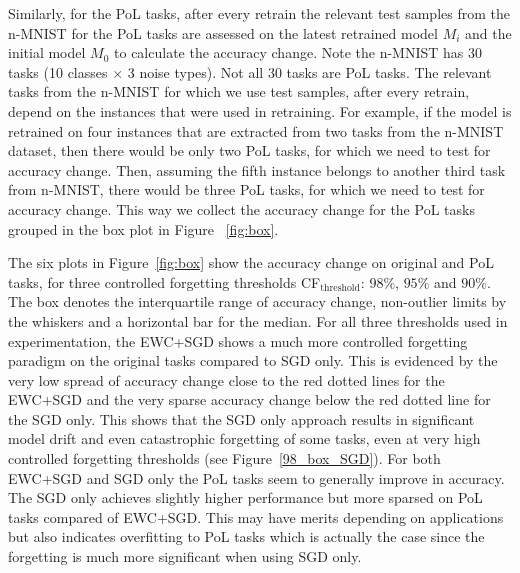 Similarly, for the PoL tasks, after every retrain the relevant test samples from the n-MNIST for the PoL tasks are assessed on the latest retrained model $M_i$ and the initial model $M_0$ to calculate the accuracy change.
%
Note the n-MNIST has 30 tasks (10 classes $\times$ 3 noise types). 
%
Not all 30 tasks are PoL tasks. 
%
The relevant tasks from the n-MNIST for which we use test samples, after every retrain, depend on the instances that were used in retraining. 
%
For example, if the model is retrained on four instances that are extracted from two tasks from the n-MNIST dataset, then there would be only two PoL tasks, for which we need to test for accuracy change. 
%
Then, assuming the fifth instance belongs to another third task from n-MNIST, there would be three PoL tasks, for which we need to test for accuracy change.  
%
This way we collect the accuracy change for the PoL tasks grouped in the box plot in Figure ~\ref{fig:box}.

The six plots in Figure~\ref{fig:box} show the accuracy change on original and PoL tasks, for three controlled forgetting thresholds CF$_{\text{threshold}}$: $98\%$,  $95\%$ and $90\%$.
%
The box denotes the interquartile range of accuracy change, non-outlier limits by the whiskers and a horizontal bar for the median. 
%
For all three thresholds used in experimentation, the EWC+SGD shows a much more controlled forgetting paradigm on the original tasks compared to SGD only. 
%
This is evidenced by the very low spread of accuracy change close to the red dotted lines for the EWC+SGD and the very sparse accuracy change below the red dotted line for the SGD only.
%
This shows that the SGD only approach results in significant model drift and even catastrophic forgetting of some tasks, even at very high controlled forgetting thresholds (see Figure~\ref{98_box_SGD}).
%
For both EWC+SGD and SGD only the PoL tasks seem to generally improve in accuracy. 
%
The SGD only achieves slightly higher performance but more sparsed on PoL tasks compared of EWC+SGD. 
%
This may have merits depending on applications but also indicates overfitting to PoL tasks which is actually the case since the forgetting is much more significant when using SGD only.   


